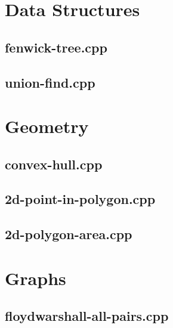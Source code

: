 \documentclass[10pt,twocolumn,landscape]{article}
\author{Make Programming Great Again™}
\begin{document}
\maketitle
\clearpage

\section{Data Structures}

\subsection{fenwick-tree.cpp}


\subsection{union-find.cpp}


\section{Geometry}

\subsection{convex-hull.cpp}


\subsection{2d-point-in-polygon.cpp}


\subsection{2d-polygon-area.cpp}


\section{Graphs}

\subsection{floydwarshall-all-pairs.cpp}

\end{document}
